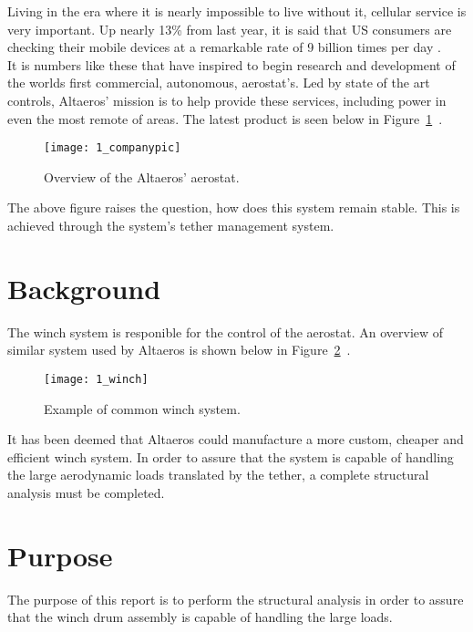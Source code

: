 \label{chapt:intro}

Living in the era where it is nearly impossible to live without it, cellular service is very important. Up nearly 13\% from last year, it is said that US consumers are checking their mobile devices at a remarkable rate of 9 billion times per day \cite{deloittestat}.\\

It is numbers like these that have inspired \Company to begin research and development of the worlds first commercial, autonomous, aerostat's. Led by state of the art controls, Altaeros' mission is to help provide these services, including power in even the most remote of areas. The latest product is seen below in Figure~\ref{fig:1_companypic}~\cite{companypicweb}.

\begin{figure}[H]
	\centering
	\texttt{[image: 1\_companypic]}
	\caption{Overview of the Altaeros' aerostat.\cite{companypicweb}}
	\label{fig:1_companypic}
\end{figure}


The above figure raises the question, how does this system remain stable. This is achieved through the system's tether management system.

\section{Background} %

The winch system is responible for the control of the aerostat. An overview of similar system used by Altaeros is shown below in Figure~\ref{fig:1_winch}~\cite{winchpic}.
\begin{figure}[H]
	\centering
	\texttt{[image: 1\_winch]}
	\caption{Example of common winch system.\cite{winchpic}}
	\label{fig:1_winch}
\end{figure}

It has been deemed that Altaeros could manufacture a more custom, cheaper and efficient winch system. In order to assure that the system is capable of handling the large aerodynamic loads translated by the tether, a complete structural analysis must be completed.

\section{Purpose}
The purpose of this report is to perform the structural analysis in order to assure that the winch drum assembly is capable of handling the large loads.\\

